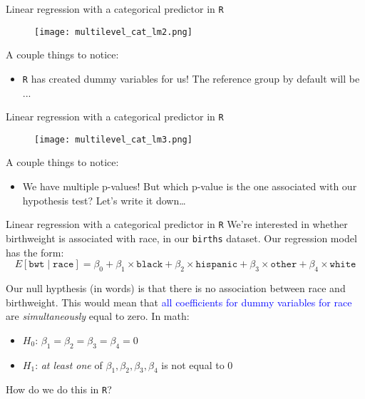 \documentclass[10pt,t]{beamer}
\begin{document}
\begin{frame}{Linear regression with a categorical predictor in \texttt{R}}

\begin{figure}
	\centering \texttt{[image: multilevel\_cat\_lm2.png]}
\end{figure}

\vspace{0.1cm}

A couple things to notice:
\begin{itemize}
	\item \texttt{R} has created dummy variables for us! The reference group by default will be ...
\end{itemize}

\end{frame}

\begin{frame}{Linear regression with a categorical predictor in \texttt{R}}

\begin{figure}
	\centering \texttt{[image: multilevel\_cat\_lm3.png]}
\end{figure}

\vspace{0.1cm}

A couple things to notice:
\begin{itemize}
	\item We have multiple p-values! But which p-value is the one associated with our hypothesis test? Let's write it down\dots
\end{itemize}

\end{frame}

\begin{frame}{Linear regression with a categorical predictor in \texttt{R}}
We're interested in whether birthweight is associated with race, in our \texttt{births} dataset. Our regression model has the form:
$$
E[\texttt{bwt} \mid \texttt{race}] = \beta_0 + \beta_1 \times \texttt{black} + \beta_2 \times \texttt{hispanic} + \beta_3 \times \texttt{other} + \beta_4 \times \texttt{white}
$$ \pause

Our null hypthesis (in words) is that there is no association between race and birthweight. This would mean that \textcolor{blue}{all coefficients for dummy variables for race} are \textit{simultaneously} equal to zero. \pause In math:

\vspace{0.3cm}

\begin{itemize}
	\item $H_0$: $\beta_1 = \beta_2 = \beta_3 =\beta_4 =  0$
	\item $H_1$: \textit{at least one} of $\beta_1, \beta_2, \beta_3, \beta_4$ is not equal to $0$
\end{itemize} \pause

\vspace{0.3cm}

How do we do this in \texttt{R}?

\end{frame}
\end{document}
